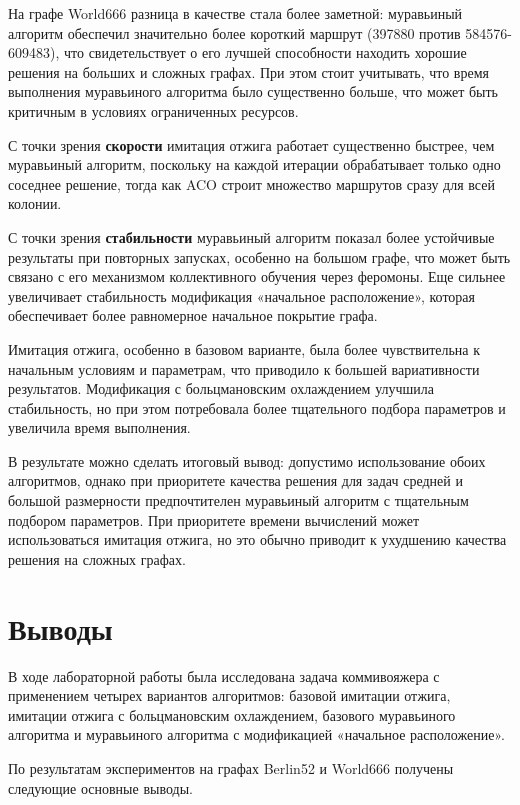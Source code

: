 \documentclass[12pt,a4paper]{article}
\begin{document}
На графе World666 разница в качестве стала более заметной:
муравьиный алгоритм обеспечил значительно более короткий маршрут
(397880 против 584576-609483), что свидетельствует о его лучшей
способности находить хорошие решения на больших и сложных графах. При этом
стоит учитывать, что время выполнения муравьиного алгоритма было существенно
больше, что может быть критичным в условиях ограниченных ресурсов.

С точки зрения \textbf{скорости} имитация отжига работает существенно быстрее, чем
муравьиный алгоритм, поскольку на каждой итерации обрабатывает только одно соседнее
решение, тогда как ACO строит множество маршрутов сразу для всей колонии.

С точки зрения \textbf{стабильности} муравьиный алгоритм показал более устойчивые
результаты при повторных запусках, особенно на большом графе, что может быть
связано с его механизмом коллективного обучения через феромоны. Еще сильнее увеличивает
стабильность модификация «начальное расположение», которая обеспечивает более
равномерное начальное покрытие графа.

Имитация отжига, особенно в базовом варианте, была более чувствительна
к начальным условиям и параметрам, что приводило к большей вариативности
результатов. Модификация с больцмановским охлаждением улучшила стабильность,
но при этом потребовала более тщательного подбора параметров и увеличила время выполнения.

В результате можно сделать итоговый вывод: допустимо использование обоих алгоритмов,
однако при приоритете качества решения для задач средней и большой размерности
предпочтителен муравьиный алгоритм с тщательным подбором параметров.
При приоритете времени вычислений может использоваться имитация отжига,
но это обычно приводит к ухудшению качества решения на сложных графах.

\section{Выводы}

В ходе лабораторной работы была исследована задача коммивояжера с применением
четырех вариантов алгоритмов: базовой имитации отжига, имитации отжига с
больцмановским охлаждением, базового муравьиного алгоритма и муравьиного
алгоритма с модификацией «начальное расположение».

По результатам экспериментов на графах Berlin52 и World666 получены следующие
основные выводы.
\end{document}
